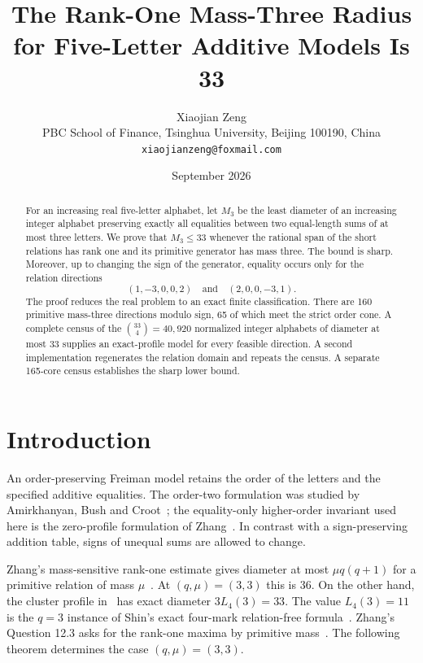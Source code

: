\documentclass[11pt]{article}
\title{The Rank-One Mass-Three Radius for Five-Letter Additive Models Is 33}
\author{Xiaojian Zeng\\
  \small PBC School of Finance, Tsinghua University, Beijing 100190, China\\
  \small \texttt{xiaojianzeng@foxmail.com}}
\date{September 2026}
\theoremstyle{definition}
\begin{document}
\maketitle

\begin{abstract}
For an increasing real five-letter alphabet, let $M_3$ be the least
diameter of an increasing integer alphabet preserving exactly all equalities
between two equal-length sums of at most three letters.  We prove that
$M_3\leq 33$ whenever the rational span of the short relations has rank one
and its primitive generator has mass three.  The bound is sharp.  Moreover,
up to changing the sign of the generator, equality occurs only for the
relation directions
\[
  (1,-3,0,0,2)\quad\text{and}\quad(2,0,0,-3,1).
\]
The proof reduces the real problem to an exact finite classification.  There
are 160 primitive mass-three directions modulo sign, 65 of which meet the
strict order cone.  A complete census of the $\binom{33}{4}=40{,}920$
normalized integer alphabets of diameter at most 33 supplies an exact-profile
model for every feasible direction.  A second implementation regenerates
the relation domain and repeats the census.  A separate 165-core census
establishes the sharp lower bound.
\end{abstract}

\section{Introduction}

An order-preserving Freiman model retains the order of the letters and the
specified additive equalities.  The order-two formulation was studied by
Amirkhanyan, Bush and Croot~\cite{AmirkhanyanBushCroot2016}; the equality-only
higher-order invariant used here is the zero-profile formulation of
Zhang~\cite{Zhang2026Sharp}.  In contrast with a sign-preserving addition
table, signs of unequal sums are allowed to change.

Zhang's mass-sensitive rank-one estimate gives diameter at most
$\mu q(q+1)$ for a primitive relation of mass $\mu$~\cite[Proposition
6.5]{Zhang2026Sharp}.  At $(q,\mu)=(3,3)$ this is 36.  On the other hand, the
cluster profile in~\cite[Corollary 9.2]{Zhang2026Sharp} has exact diameter
$3L_4(3)=33$.  The value $L_4(3)=11$ is the $q=3$ instance of Shin's exact
four-mark relation-free formula~\cite[Theorem 10.3]{Shin2026Spectra}.
Zhang's Question 12.3 asks for the rank-one maxima by primitive
mass~\cite[Question 12.3]{Zhang2026Sharp}.  The following theorem determines
the case $(q,\mu)=(3,3)$.
\end{document}
